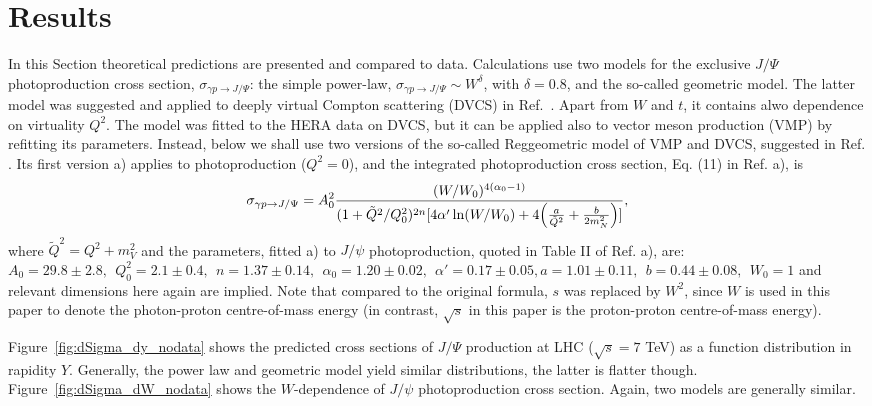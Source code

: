 \documentclass[12pt]{article}
\begin{document}
\section{Results}

In this Section theoretical predictions are presented and compared to data.
Calculations use two models for the exclusive $J/\Psi$ photoproduction cross section, $\sigma_{\gamma p \to J/\Psi}$:
the simple power-law, $\sigma_{\gamma p \to J/\Psi}\sim W^\delta$, with $\delta=0.8$, and the so-called geometric model.
The latter model was suggested and applied to deeply virtual Compton scattering (DVCS) in Ref.~\cite{Capua}.
Apart from $W$ and $t$, it contains alwo dependence on virtuality $Q^2$.
The model was fitted to the HERA data on DVCS, but it can be applied also to vector meson production (VMP) by refitting its parameters.
Instead, below we shall use two versions of the so-called Reggeometric model of VMP and DVCS, suggested in Ref. \cite{FFJS}.
Its first version \cite{FFJS} a) applies to photoproduction ($Q^2=0$), and the integrated photoproduction cross section, Eq. (11) in Ref. \cite{FFJS} a), is
\begin{equation}
\sigma_{\gamma p \to J/\Psi}=A_0^2\frac{(W/W_0)^{4(\alpha_0-1)}}{(1+\tilde Q^2/Q^2_0)^{2n}[4\alpha'\ln(W/W_0)+4\Bigl(\frac{a}{\tilde Q^2}+\frac{b}{2m_N^2}\Bigr)]},
\end{equation}
where $\tilde Q^2=Q^2+m_V^2$ and the parameters, fitted \cite{Fazio}a) to $J/\psi$ photoproduction, quoted in
Table II of Ref. \cite{Fazio}a), are: $A_0=29.8\pm 2.8,\ \ Q_0^2=2.1\pm 0.4,\ \
n=1.37\pm 0.14,\ \ \alpha_0 =1.20\pm 0.02,\ \ \alpha'=0.17\pm 0.05, a=1.01\pm 0.11,\ \ b=0.44\pm 0.08,\ \ W_0=1$ and relevant dimensions here again are implied.
Note that compared to the original formula, $s$ was replaced by $W^2$, since $W$ is used in this paper to 
denote the photon-proton centre-of-mass energy (in contrast, $\sqrt{s}$ in this paper is the proton-proton centre-of-mass energy).

Figure~\ref{fig:dSigma_dy_nodata} shows the predicted cross sections of $J/\Psi$ production at LHC ($\sqrt{s}=7$ TeV) as a function distribution in rapidity $Y$.
Generally, the power law and geometric model yield similar distributions,  the latter is flatter though.
Figure~\ref{fig:dSigma_dW_nodata} shows the $W$-dependence of $J/\psi$ photoproduction cross section.
Again, two models are generally similar.
\newpage
\end{document}
